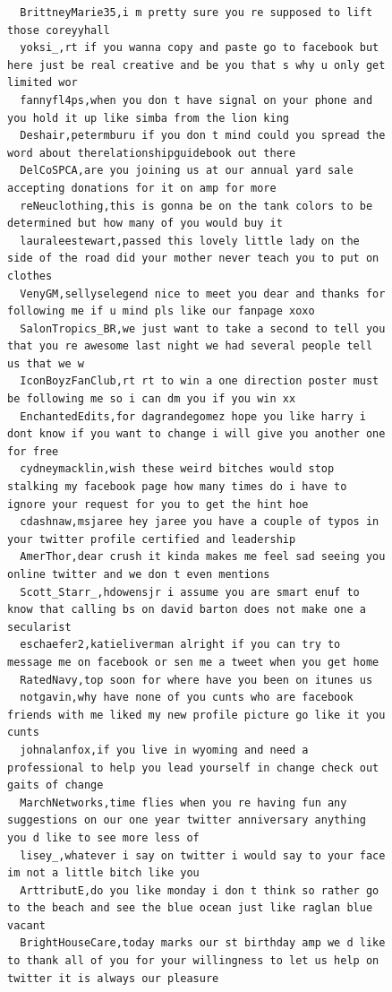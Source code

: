 \begin{figure}[htpb]
\begin{verbatim}
  BrittneyMarie35,i m pretty sure you re supposed to lift those coreyyhall
  yoksi_,rt if you wanna copy and paste go to facebook but here just be real creative and be you that s why u only get limited wor
  fannyfl4ps,when you don t have signal on your phone and you hold it up like simba from the lion king
  Deshair,petermburu if you don t mind could you spread the word about therelationshipguidebook out there
  DelCoSPCA,are you joining us at our annual yard sale accepting donations for it on amp for more
  reNeuclothing,this is gonna be on the tank colors to be determined but how many of you would buy it
  lauraleestewart,passed this lovely little lady on the side of the road did your mother never teach you to put on clothes
  VenyGM,sellyselegend nice to meet you dear and thanks for following me if u mind pls like our fanpage xoxo
  SalonTropics_BR,we just want to take a second to tell you that you re awesome last night we had several people tell us that we w
  IconBoyzFanClub,rt rt to win a one direction poster must be following me so i can dm you if you win xx
  EnchantedEdits,for dagrandegomez hope you like harry i dont know if you want to change i will give you another one for free
  cydneymacklin,wish these weird bitches would stop stalking my facebook page how many times do i have to ignore your request for you to get the hint hoe
  cdashnaw,msjaree hey jaree you have a couple of typos in your twitter profile certified and leadership
  AmerThor,dear crush it kinda makes me feel sad seeing you online twitter and we don t even mentions
  Scott_Starr_,hdowensjr i assume you are smart enuf to know that calling bs on david barton does not make one a secularist
  eschaefer2,katieliverman alright if you can try to message me on facebook or sen me a tweet when you get home
  RatedNavy,top soon for where have you been on itunes us
  notgavin,why have none of you cunts who are facebook friends with me liked my new profile picture go like it you cunts
  johnalanfox,if you live in wyoming and need a professional to help you lead yourself in change check out gaits of change
  MarchNetworks,time flies when you re having fun any suggestions on our one year twitter anniversary anything you d like to see more less of
  lisey_,whatever i say on twitter i would say to your face im not a little bitch like you
  ArttributE,do you like monday i don t think so rather go to the beach and see the blue ocean just like raglan blue vacant
  BrightHouseCare,today marks our st birthday amp we d like to thank all of you for your willingness to let us help on twitter it is always our pleasure

\end{verbatim}
\end{figure}
